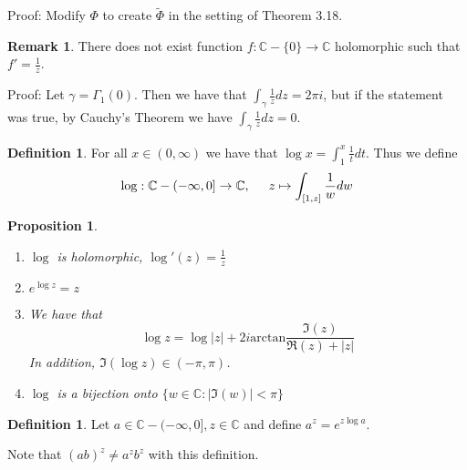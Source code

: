 \documentclass[11pt]{article}
\theoremstyle{plain}
\newtheorem{proposition}[theorem]{Proposition}
\theoremstyle{definition}
\newtheorem{definition}[theorem]{Definition}
\newtheorem{remark}{Remark}
\newcommand{\C}{\mathbb{C}}
\begin{document}
Proof: Modify $\Phi$ to create $\tilde{\Phi}$ in the setting of Theorem 3.18. 

\begin{remark}
There does not exist function $f: \C - \{0\} \to \C$ holomorphic such that $f' = \frac{1}{z}$.
\end{remark}

Proof: Let $\gamma = \Gamma_1(0)$. Then we have that $\int_{\gamma} \frac{1}{z}dz = 2\pi i$, but if the statement was true, by Cauchy's Theorem we have $\int_{\gamma} \frac{1}{z} dz = 0$.

\begin{definition}
For all $x \in (0, \infty)$ we have that $\log x = \int_1^x \frac{1}{t}dt$. Thus we define 
$$ \log : \C - (-\infty, 0] \to \C, \hspace{5mm} z \mapsto \int_{[1,z]} \frac{1}{w} dw $$
\end{definition}

\begin{proposition}
\begin{enumerate}[1.]
\item $\log$ is holomorphic, $\log'(z) = \frac{1}{z} $
\item $e^{\log z} = z $
\item We have that 
$$ \log z = \log |z| + 2i \text{arctan} \frac{\Im(z)}{\Re(z) + |z|} $$
In addition, $\Im(\log z) \in (- \pi, \pi)$.
\item $\log$ is a bijection onto $\{ w \in \C : |\Im(w)| < \pi\}$
\end{enumerate}
\end{proposition}

\begin{definition}
Let $a \in \C - (-\infty, 0], z \in \C$ and define $a^z = e^{z \log a}$.
\end{definition}

Note that $(ab)^z \neq a^z b^z$ with this definition.
\end{document}
